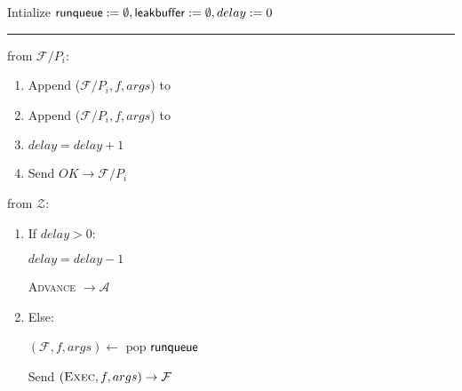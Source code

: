 \begin{bbox}[title={\textbf{Wrapper} $\Wasync$} ] 

Intialize ${\mathsf {runqueue}} := \emptyset, {\mathsf {leakbuffer}} := \emptyset, delay := 0$

\vspace{2mm} \hrule \vspace{2mm}

\OnInput {} from $\mathcal{F}/P_i$:
	\begin{enumerate}
		\item Append ($\mathcal{F}/P_i, f, args$) to 
		\item Append ($\mathcal{F}/P_i, f, args$) to 
		\item $delay = delay + 1$
		\item Send $OK \rightarrow \mathcal{F}/P_i$
	\end{enumerate}


\OnInput

\OnInput {} from $\mathcal{Z}$:
	\begin{enumerate}
		\item If $delay > 0$:

			\quad  $delay = delay - 1$

			\quad  \Send \textsc{Advance} $\rightarrow \mathcal{A}$
		\item Else:
			
			\quad $(\mathcal{F}, f, args) \leftarrow$ pop ${\mathsf {runqueue}}$

			\quad Send $(\textsc{Exec}, f, args) \rightarrow \mathcal{F}$
	\end{enumerate}
\end{bbox}
